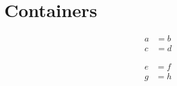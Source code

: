\documentclass{article}
\begin{document}
\section{Containers}

\begin{table}[h]
\begin{minipage}[b]{0.5\linewidth}
\centering
\begin{align*}
  a &= b \\
  c &= d
\end{align*}
\end{minipage}
\hspace{0.5cm}
\begin{minipage}[b]{0.5\linewidth}
\centering
\begin{align*}
  e &= f \\
  g &= h
\end{align*}
\end{minipage}
\end{table}
\end{document}
